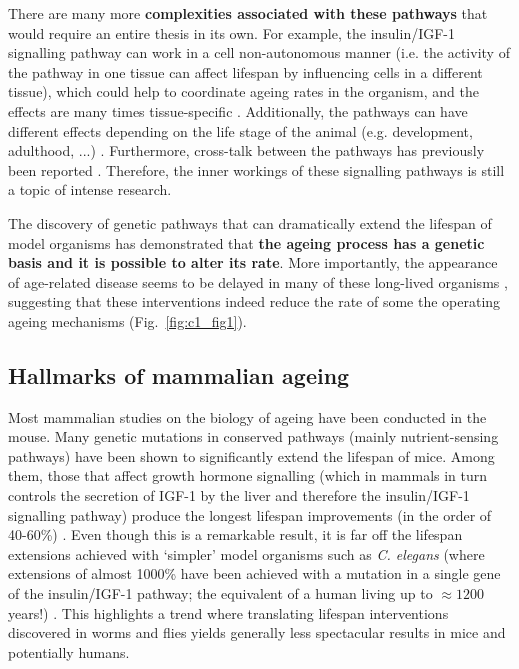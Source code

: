 \bigskip

There are many more \textbf{complexities associated with these pathways} that would require an entire thesis in its own. For example, the insulin/IGF-1 signalling pathway can work in a cell non-autonomous manner (i.e. the activity of the pathway in one tissue can affect lifespan by influencing cells in a different tissue), which could help to coordinate ageing rates in the organism, and the effects are many times tissue-specific \cite{Kenyon2005,Kenyon2010}. Additionally, the pathways can have different effects depending on the life stage of the animal (e.g. development, adulthood, ...) \cite{Dillin2002}. Furthermore, cross-talk between the pathways has previously been reported \cite{Bonkowski2016, Greer2007}. Therefore, the inner workings of these signalling pathways is still a topic of intense research.

\bigskip

The discovery of genetic pathways that can dramatically extend the lifespan of model organisms has demonstrated that \textbf{the ageing process has a genetic basis and it is possible to alter its rate}. More importantly, the appearance of age-related disease seems to be delayed in many of these long-lived organisms \cite{Kenyon2010,Arantes-Oliveira2003}, suggesting that these interventions indeed reduce the rate of some the operating ageing mechanisms (Fig.~\ref{fig:c1_fig1}). 

\smallskip

\subsection{Hallmarks of mammalian ageing} \label{s:1.1.3}

\smallskip

Most mammalian studies on the biology of ageing have been conducted in the mouse. Many genetic mutations in conserved pathways (mainly nutrient-sensing pathways) have been shown to significantly extend the lifespan of mice. Among them, those that affect growth hormone signalling (which in mammals in turn controls the secretion of IGF-1 by the liver and therefore the insulin/IGF-1 signalling pathway) produce the longest lifespan improvements (in the order of 40-60\%) \cite{Singh2019}. Even though this is a remarkable result, it is far off the lifespan extensions achieved with `simpler' model organisms such as \textit{C. elegans} (where extensions of almost 1000\% have been achieved with a mutation in a single gene of the insulin/IGF-1 pathway; the equivalent of a human living up to $\approx 1200$ years!) \cite{Ayyadevara2008}. This highlights a trend where translating lifespan interventions discovered in worms and flies yields generally less spectacular results in mice and potentially humans.

